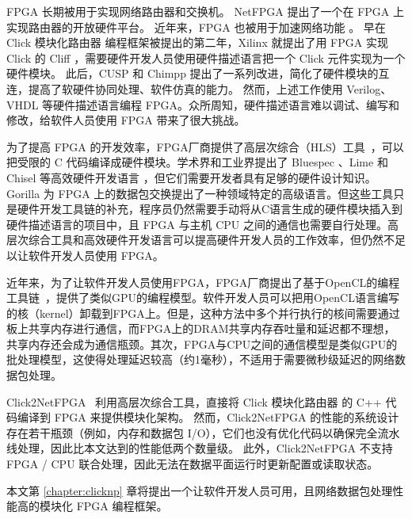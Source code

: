 FPGA 长期被用于实现网络路由器和交换机。
NetFPGA \cite{lockwood2007netfpga} 提出了一个在 FPGA 上实现路由器的开放硬件平台。
近年来，FPGA 也被用于加速网络功能 \cite {rubow2010chimpp,lavasani2012compiling}。
早在 Click 模块化路由器 \cite{kohler2000click} 编程框架被提出的第二年，Xilinx 就提出了用 FPGA 实现 Click 的 Cliff \cite{kulkarni2004mapping}，需要硬件开发人员使用硬件描述语言把一个 Click 元件实现为一个硬件模块。
此后，CUSP \cite{schelle2005cusp} 和 Chimpp \cite {rubow2010chimpp} 提出了一系列改进，简化了硬件模块的互连，提高了软硬件协同处理、软件仿真的能力。
然而，上述工作使用 Verilog、VHDL 等硬件描述语言编程 FPGA。众所周知，硬件描述语言难以调试、编写和修改，给软件人员使用 FPGA 带来了很大挑战。

为了提高 FPGA 的开发效率，FPGA厂商提供了高层次综合（HLS）工具~\cite{vivado,intel-hls}，可以把受限的 C 代码编译成硬件模块。学术界和工业界提出了 Bluespec \cite{bluespec}、Lime \cite{auerbach2010lime} 和 Chisel \cite{bachrach2012chisel} 等高效硬件开发语言 \cite{bacon2013fpga,singh2011implementing,wester2015transformation}，但它们需要开发者具有足够的硬件设计知识。Gorilla \cite {lavasani2012compiling} 为 FPGA 上的数据包交换提出了一种领域特定的高级语言。但这些工具只是硬件开发工具链的补充，程序员仍然需要手动将从C语言生成的硬件模块插入到硬件描述语言的项目中，且 FPGA 与主机 CPU 之间的通信也需要自行处理。高层次综合工具和高效硬件开发语言可以提高硬件开发人员的工作效率，但仍然不足以让软件开发人员使用 FPGA。

近年来，为了让软件开发人员使用FPGA，FPGA厂商提出了基于OpenCL的编程工具链~\cite{aoc,sdaccel}，提供了类似GPU的编程模型。软件开发人员可以把用OpenCL语言编写的核（kernel）卸载到FPGA上。但是，这种方法中多个并行执行的核间需要通过板上共享内存进行通信，而FPGA上的DRAM共享内存吞吐量和延迟都不理想，共享内存还会成为通信瓶颈。其次，FPGA与CPU之间的通信模型是类似GPU的批处理模型，这使得处理延迟较高（约1毫秒），不适用于需要微秒级延迟的网络数据包处理。

Click2NetFPGA~\cite {Click2NetFPGA} 利用高层次综合工具，直接将 Click 模块化路由器 \cite {kohler2000click} 的 C++ 代码编译到 FPGA 来提供模块化架构。
然而，Click2NetFPGA 的性能的系统设计存在若干瓶颈（例如，内存和数据包 I/O），它们也没有优化代码以确保完全流水线处理，因此比本文达到的性能低两个数量级。
此外，Click2NetFPGA 不支持 FPGA / CPU 联合处理，因此无法在数据平面运行时更新配置或读取状态。

本文第 \ref{chapter:clicknp} 章将提出一个让软件开发人员可用，且网络数据包处理性能高的模块化 FPGA 编程框架。









